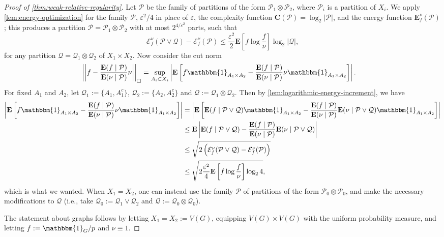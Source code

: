 \documentclass[reqno,11pt]{amsart}
\theoremstyle{definition}
\theoremstyle{remark}
\numberwithin{equation}{section}
\newcommand{\C}{\mathbf{C}}
\newcommand{\E}{\mathbf{E}}
\newcommand{\mE}{\mathcal{E}}
\newcommand{\mP}{\mathcal{P}}
\newcommand{\mQ}{\mathcal{Q}}
\newcommand{\one}{\mathbbm{1}}
\newcommand{\eps}{\varepsilon}
\newcommand{\sq}{_{\substack{ \\ \square}}}
\begin{document}
\begin{proof}[Proof of \cref{thm:weak-relative-regularity}]
Let $\mathscr{P}$ be the family of partitions of the form $\mP_1 \otimes \mP_2$, where $\mP_i$ is a partition of $X_i$. We apply \cref{lem:energy-optimization} for the family $\mathscr{P}$, $\eps^2/4$ in place of $\eps$, the complexity function $\C(\mP) = \log_2 |\mP|$, and the energy function $\E_f^\nu(\mP)$; this produces a partition $\mP = \mP_1 \otimes \mP_2$ with at most $2^{4/\eps^2}$ parts, such that
\[
    \mE_f^\nu (\mP \vee \mQ) - \mE_f^\nu(\mP) \le 
    \frac{\eps^2}{2} \E\left[f \log \frac{f}{\nu}\right] \log_2 |\mQ|,
\]
for any partition $\mQ = \mQ_1 \otimes \mQ_2$ of $X_1 \times X_2$. Now consider the cut norm
\[
\begin{aligned}
    \left\vert \left\vert f - \frac{\E(f \mid \mP)}{\E(\nu \mid \mP)}\nu\right\vert\right\vert\sq
    &=
    \sup_{A_i \subset X_i} \left\vert \E \left[ f \one_{A_1 \times A_2} - \frac{\E(f \mid \mP)}{\E(\nu \mid \mP)}\nu \one_{A_1 \times A_2} \right] \right\vert.
\end{aligned}
\]
For fixed $A_1$ and $A_2$, let $\mQ_1 := \{A_1, A_1^c\}$, $\mQ_2 := \{A_2, A_2^c\}$ and $\mQ := \mQ_1 \otimes \mQ_2$. Then by \cref{lem:logarithmic-energy-increment}, we have
\[
\begin{aligned}
    \left\vert \E \left[ f \one_{A_1 \times A_2} - \frac{\E(f \mid \mP)}{\E(\nu \mid \mP)}\nu \one_{A_1 \times A_2} \right] \right\vert
    &=
    \left\vert \E \left[ \E(f \mid \mP \vee \mQ) \one_{A_1 \times A_2} - \frac{\E(f \mid \mP)}{\E(\nu \mid \mP)}\E(\nu \mid \mP \vee \mQ) \one_{A_1 \times A_2} \right] \right\vert
    \\
    &\le 
    \E \left\vert 
    \E(f \mid \mP \vee \mQ) - \frac{\E(f \mid \mP)}{\E(\nu \mid \mP)}\E(\nu \mid \mP \vee \mQ) \right\vert
    \\
    &\le 
    \sqrt{2\left( \mE_f^\nu (\mP \vee \mQ) - \mE_f^\nu(\mP) \right)}
    \\
    &\le
    \sqrt{2\frac{\eps^2}{4}\E \left[f \log \frac{f}{\nu} \right] \log_2 4},
\end{aligned}
\]
which is what we wanted. When $X_1 = X_2$, one can instead use the family $\mathscr{P}$ of partitions of the form $\mP_0 \otimes \mP_0$, and make the necessary modifications to $\mQ$ (i.e., take $\mQ_0 := \mQ_1 \vee \mQ_2$ and $\mQ := \mQ_0 \otimes \mQ_0$).

The statement about graphs follows by letting $X_1 = X_2 := V(G)$, equipping $V(G) \times V(G)$ with the uniform probability measure, and letting $f := \one_G/p$ and $\nu \equiv 1$.



\end{proof}
\end{document}
